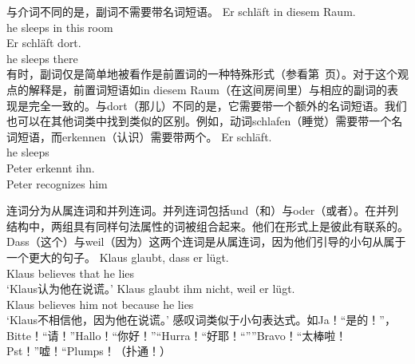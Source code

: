 与介词不同的是，副词不需要带名词短语。
\eal
\ex
\gll Er schläft in diesem Raum.\\
	 he sleeps in this room\\
\ex
\gll Er schläft dort.\\
	 he sleeps there\\
\zl
有时，副词仅是简单地被看作是前置词的一种特殊形式（参看第~\pageref{Seite-Adverbien-PP}页）。对于这个观点的解释是，前置词短语如in diesem Raum（在这间房间里）与相应的副词的表现是完全一致的。与dort（那儿）不同的是，它需要带一个额外的名词短语。我们也可以在其他词类中找到类似的区别。例如，动词schlafen（睡觉）需要带一个名词短语，而erkennen（认识）需要带两个。
\eal
\ex 
\gll Er schläft.\\
     he sleeps\\
\ex 
\gll Peter erkennt ihn.\\
     Peter recognizes him\\
\zl

连词分为从属连词和并列连词。并列连词包括und（和）与oder（或者）。在并列结构中，两组具有同样句法属性的词被组合起来。他们在形式上是彼此有联系的。Dass（这个）与weil（因为）这两个连词是从属连词，因为他们引导的小句从属于一个更大的句子。
\eal
\ex 
\gll Klaus glaubt, dass er lügt.\\
	 Klaus believes that he lies\\
\glt `Klaus认为他在说谎。'
\ex 
\gll Klaus glaubt ihm nicht, weil er lügt.\\
	 Klaus believes him not because he lies\\
\glt `Klaus不相信他，因为他在说谎。'
\zl
感叹词类似于小句表达式。如Ja！“是的！”，Bitte！“请！”Hallo！“你好！”“Hurra！“好耶！“””Bravo！“太棒啦！Pst！”嘘！“Plumps！（扑通！）
 
